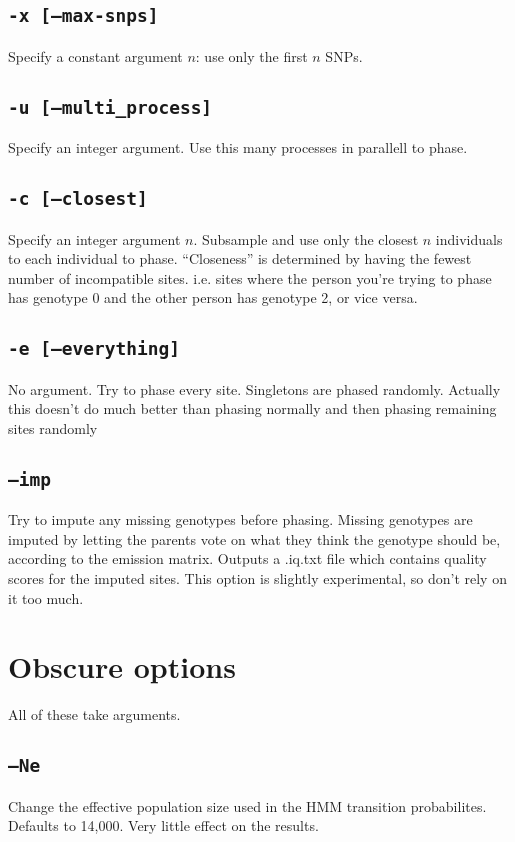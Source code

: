 \documentclass[10pt]{refart}
\begin{document}
\subsection{\texttt{-x [--max-snps]}}
Specify a constant argument $n$: use only the first $n$ SNPs.  

\subsection{\texttt{-u [--multi\_process]}}
Specify an integer argument. Use this many processes in parallell to phase. 

\subsection{\texttt{-c [--closest]}}
Specify an integer argument $n$. Subsample and use only the closest $n$ individuals to each individual to phase. ``Closeness'' is determined by having the fewest number of incompatible sites. i.e. sites where the person you're trying to phase has genotype 0 and the other person has genotype 2, or vice versa. 

\subsection{\texttt{-e [--everything]}}
No argument. Try to phase every site. Singletons are phased randomly. Actually this doesn't do much better than phasing normally and then phasing remaining sites randomly

\subsection{\texttt{--imp}}
Try to impute any missing genotypes before phasing. Missing genotypes are
imputed by letting the parents vote on what they think the
genotype should be, according to the emission matrix. Outputs a
.iq.txt file which contains quality scores for the imputed
sites. This option is slightly experimental, so don't rely on it too
much. 

\newpage

\section{Obscure options}
All of these take arguments. 
\subsection{\texttt{--Ne}}
Change the effective population size used in the HMM transition probabilites. Defaults to 14,000. Very little effect on the results.
\end{document}
